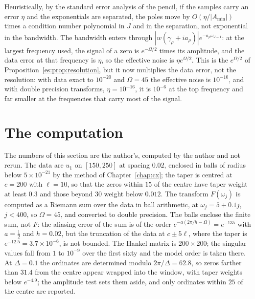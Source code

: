 Heuristically, by the standard error analysis of the pencil, if the samples carry an error $\eta$ and the exponentials are separated, the poles move by $O(\eta/|A_{\min}|)$ times a condition number polynomial in $J$ and in the separation, not exponential in the bandwidth. The bandwidth enters through $|w(\gamma_\rho+ia_\rho)|e^{-a_\rho\omega_{J-1}}$: at the largest frequency used, the signal of a zero is $e^{-\Omega/2}$ times its amplitude, and the data error at that frequency is $\eta$, so the effective noise is $\eta e^{\Omega/2}$. This is the $e^{\Omega/2}$ of Proposition~\ref{es:prop:resolution}, but it now multiplies the data error, not the resolution: with data exact to $10^{-20}$ and $\Omega=45$ the effective noise is $10^{-10}$, and with double precision transforms, $\eta=10^{-16}$, it is $10^{-6}$ at the top frequency and far smaller at the frequencies that carry most of the signal.

\section{The computation}\label{es:sec:computation}

The numbers of this section are the author's, computed by the author and not rerun. The data are $u_1$ on $[150,250]$ at spacing $0.02$, enclosed in balls of radius below $5\times10^{-21}$ by the method of Chapter~\ref{chap:cx}; the taper is centred at $c=200$ with $\ell=10$, so that the zeros within $15$ of the centre have taper weight at least $0.3$ and those beyond $30$ weight below $0.012$. The transform $F(\omega_j)$ is computed as a Riemann sum over the data in ball arithmetic, at $\omega_j=5+0.1j$, $j<400$, so $\Omega=45$, and converted to double precision. The balls enclose the finite sum, not $F$: the aliasing error of the sum is of the order $e^{-a(2\pi/h-\Omega)}=e^{-135}$ with $a=\tfrac12$ and $h=0.02$, but the truncation of the data at $c\pm5\ell$, where the taper is $e^{-12.5}=3.7\times10^{-6}$, is not bounded. The Hankel matrix is $200\times200$; the singular values fall from $1$ to $10^{-9}$ over the first sixty and the model order is taken there. At $\Delta=0.1$ the ordinates are determined modulo $2\pi/\Delta=62.8$, so zeros farther than $31.4$ from the centre appear wrapped into the window, with taper weights below $e^{-4.9}$; the amplitude test sets them aside, and only ordinates within $25$ of the centre are reported.

